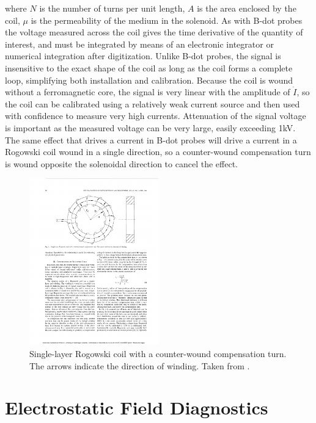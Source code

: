 \documentclass{jpp}
\begin{document}
where $N$ is the number of turns per unit length, $A$ is the area enclosed by the coil, $\mu$ is the permeability of the medium in the solenoid. As with B-dot probes the voltage measured across the coil gives the time derivative of the quantity of interest, and must be integrated by means of an electronic integrator or numerical integration after digitization. Unlike B-dot probes, the signal is insensitive to the exact shape of the coil as long as the coil forms a complete loop, simplifying both installation and calibration. Because the coil is wound without a ferromagnetic core, the signal is very linear with the amplitude of $\dot{I}$, so the coil can be calibrated using a relatively weak current source and then used with confidence to measure very high currents. Attenuation of the signal voltage is important as the measured voltage can be very large, easily exceeding 1kV. The same effect that drives a current in B-dot probes will drive a current in a Rogowski coil wound in a single direction, so a counter-wound compensation turn is wound opposite the solenoidal direction to cancel the effect.

\begin{figure}
  \centering
  \includegraphics[width=0.5\textwidth]{rogowski.pdf}%
  \caption{Single-layer Rogowski coil with a counter-wound compensation turn. The arrows indicate the direction of winding. Taken from \citep{492777}.}
\label{fig:rogowski}
\end{figure}

\section{Electrostatic Field Diagnostics}
\end{document}
